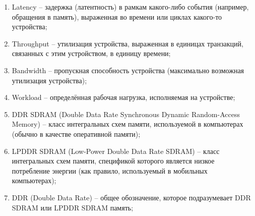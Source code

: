 \begin{enumerate}
    \item Latency -- задержка (латентность) в рамкам какого-либо события (например,
        обращения в память), выраженная во времени или циклах какого-то устройства;
    \item Throughput -- утилизация устройства, выраженная в единицах транзакций, связанных с
        этим устройством, в единицу времени;
    \item Bandwidth -- пропускная способность устройства (максимально возможная утилизация
        устройства);
    \item Workload -- определённая рабочая нагрузка, исполняемая на устройстве;
    \item DDR SDRAM (Double Data Rate Synchronous Dynamic Random-Access Memory) -- класс
        интегральных схем памяти, используемой в компьютерах (обычно в качестве оперативной
        памяти);
    \item LPDDR SDRAM (Low-Power Double Data Rate SDRAM) -- класс интегральных
        схем памяти, спецификой которого является низкое потребление энергии (как правило,
        используемый в мобильных компьютерах);
    \item DDR (Double Data Rate) -- общее обозначение, которое подразумевает DDR SDRAM или
        LPDDR SDRAM память;

\end{enumerate}

